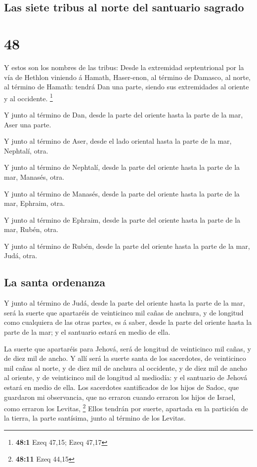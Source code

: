 \hypertarget{las-siete-tribus-al-norte-del-santuario-sagrado}{%
\subsection{Las siete tribus al norte del santuario
sagrado}\label{las-siete-tribus-al-norte-del-santuario-sagrado}}

\hypertarget{section-47}{%
\section{48}\label{section-47}}

 Y estos son los nombres de las tribus: Desde la extremidad
septentrional por la vía de Hethlon viniendo á Hamath, Haser-enon, al
término de Damasco, al norte, al término de Hamath: tendrá Dan una
parte, siendo sus extremidades al oriente y al occidente. \footnote{\textbf{48:1}
  Ezeq 47,15; Ezeq 47,17}

 Y junto al término de Dan, desde la parte del oriente hasta
la parte de la mar, Aser una parte.

 Y junto al término de Aser, desde el lado oriental hasta la
parte de la mar, Nephtalí, otra.

 Y junto al término de Nephtalí, desde la parte del oriente
hasta la parte de la mar, Manasés, otra.

 Y junto al término de Manasés, desde la parte del oriente
hasta la parte de la mar, Ephraim, otra.

 Y junto al término de Ephraim, desde la parte del oriente
hasta la parte de la mar, Rubén, otra.

 Y junto al término de Rubén, desde la parte del oriente
hasta la parte de la mar, Judá, otra.

\hypertarget{la-santa-ordenanza}{%
\subsection{La santa ordenanza}\label{la-santa-ordenanza}}

 Y junto al término de Judá, desde la parte del oriente
hasta la parte de la mar, será la suerte que apartaréis de veinticinco
mil cañas de anchura, y de longitud como cualquiera de las otras partes,
es á saber, desde la parte del oriente hasta la parte de la mar; y el
santuario estará en medio de ella.

 La suerte que apartaréis para Jehová, será de longitud de
veinticinco mil cañas, y de diez mil de ancho.  Y allí será
la suerte santa de los sacerdotes, de veinticinco mil cañas al norte, y
de diez mil de anchura al occidente, y de diez mil de ancho al oriente,
y de veinticinco mil de longitud al mediodía: y el santuario de Jehová
estará en medio de ella.  Los sacerdotes santificados de
los hijos de Sadoc, que guardaron mi observancia, que no erraron cuando
erraron los hijos de Israel, como erraron los Levitas, \footnote{\textbf{48:11}
  Ezeq 44,15}  Ellos tendrán por suerte, apartada en la
partición de la tierra, la parte santísima, junto al término de los
Levitas.

